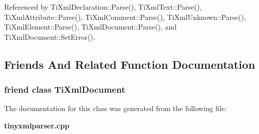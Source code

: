 Referenced by TiXmlDeclaration::Parse(), TiXmlText::Parse(), TiXmlAttribute::Parse(), TiXmlComment::Parse(), TiXmlUnknown::Parse(), TiXmlElement::Parse(), TiXmlDocument::Parse(), and TiXmlDocument::SetError().

\subsection{Friends And Related Function Documentation}
\subsubsection[TiXmlDocument]{\setlength{\rightskip}{0pt plus 5cm}friend class {\bf TiXmlDocument}\hspace{0.3cm}{\tt  [friend]}}\label{classTiXmlParsingData_173617f6dfe902cf484ce5552b950475}




The documentation for this class was generated from the following file:\begin{CompactItemize}
\item 
{\bf tinyxmlparser.cpp}\end{CompactItemize}
